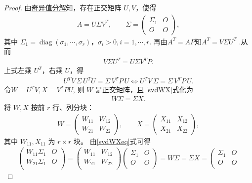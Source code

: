 \documentclass[../../main.tex]{subfiles}%
\begin{document}
\begin{proof}
由\hyperref[theorem:奇异值分解]{奇异值分解}知，存在正交矩阵 $U,V$，使得
\begin{align*}
A=U\Sigma V^T,\qquad 
\Sigma=\begin{pmatrix}
\Sigma_1&O\\
O&O
\end{pmatrix},
\end{align*}
其中 $\Sigma_1=\operatorname{diag}(\sigma_1,\cdots,\sigma_r)$，$\sigma_i>0,i=1,\cdots,r$.
再由$A^T=AP$知$A^T=V\Sigma U^T$ .从而
\begin{align*}
V\Sigma U^T=U\Sigma V^T P.
\end{align*}
上式左乘 $U^T$，右乘 $U$，得
\begin{align}
U^T V\,\Sigma\, U^T U = \Sigma\, V^T P\,U\iff U^T V\,\Sigma = \Sigma\, V^T P\,U. \label{svdWX}
\end{align}
令$W=U^T V, X=V^T P U$,
则 $W$ 是正交矩阵，且 \eqref{svdWX}式化为
\begin{align}
W\Sigma=\Sigma X. \label{svdWXeq}
\end{align}
将 $W,X$ 按前 $r$ 行、列分块：
\begin{align*}
W=\begin{pmatrix}
W_{11}&W_{12}\\
W_{21}&W_{22}
\end{pmatrix},\qquad
X=\begin{pmatrix}
X_{11}&X_{12}\\
X_{21}&X_{22}
\end{pmatrix},
\end{align*}
其中 $W_{11},X_{11}$ 为 $r\times r$ 块。
由\eqref{svdWXeq}式可得
\begin{align*}
\left( \begin{matrix}
W_{11}\Sigma _1&		O\\
W_{21}\Sigma _1&		O\\
\end{matrix} \right) =\left( \begin{matrix}
W_{11}&		W_{12}\\
W_{21}&		W_{22}\\
\end{matrix} \right) \left( \begin{matrix}
\Sigma _1&		O\\
O&		O\\
\end{matrix} \right) =W\Sigma =\Sigma X=\left( \begin{matrix}
\Sigma _1&		O\\
O&		O\\

\end{matrix}
\end{align*}
\end{proof}
\end{document}
